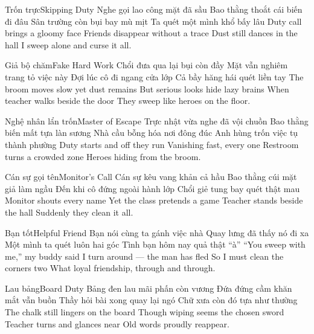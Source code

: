 \begin{tutuyetbox}{Trốn trực}{Skipping Duty}
Nghe gọi lao công mặt đã sầu
Bao thằng thoắt cái biến đi đâu
Sân trường còn bụi bay mù mịt
Ta quét một mình khổ bấy lâu
\tcblower
Duty call brings a gloomy face
Friends disappear without a trace
Dust still dances in the hall
I sweep alone and curse it all.
\end{tutuyetbox}

\begin{tutuyetbox}{Giả bộ chăm}{Fake Hard Work}
Chổi đưa qua lại bụi còn đầy
Mặt vẫn nghiêm trang tỏ việc này
Đợi lúc cô đi ngang cửa lớp
Cả bầy hăng hái quét liền tay
\tcblower
The broom moves slow yet dust remains
But serious looks hide lazy brains
When teacher walks beside the door
They sweep like heroes on the floor.
\end{tutuyetbox}

\begin{tutuyetbox}{Nghệ nhân lẩn trốn}{Master of Escape}
Trực nhật vừa nghe đã vội chuồn
Bao thằng biến mất tựa làn sương
Nhà cầu bỗng hóa nơi đông đúc
Anh hùng trốn việc tụ thành phường
\tcblower
Duty starts and off they run
Vanishing fast, every one
Restroom turns a crowded zone
Heroes hiding from the broom.
\end{tutuyetbox}

\begin{tutuyetbox}{Cán sự gọi tên}{Monitor's Call}
Cán sự kêu vang khản cả hầu
Bao thằng cúi mặt giả làm ngầu
Đến khi cô đứng ngoài hành lớp
Chổi giẻ tung bay quét thật mau
\tcblower
Monitor shouts every name
Yet the class pretends a game
Teacher stands beside the hall
Suddenly they clean it all.
\end{tutuyetbox}

\begin{tutuyetbox}{Bạn tốt}{Helpful Friend}
Bạn nói cùng ta gánh việc nhà
Quay lưng đã thấy nó đi xa
Một mình ta quét luôn hai góc
Tình bạn hôm nay quả thật “à”
\tcblower
“You sweep with me,” my buddy said
I turn around — the man has fled
So I must clean the corners two
What loyal friendship, through and through.
\end{tutuyetbox}

\begin{tutuyetbox}{Lau bảng}{Board Duty}
Bảng đen lau mãi phấn còn vương
Đứa đứng cầm khăn mắt vẫn buồn
Thầy hỏi bài xong quay lại ngó
Chữ xưa còn đó tựa như thường
\tcblower
The chalk still lingers on the board
Though wiping seems the chosen sword
Teacher turns and glances near
Old words proudly reappear.
\end{tutuyetbox}

